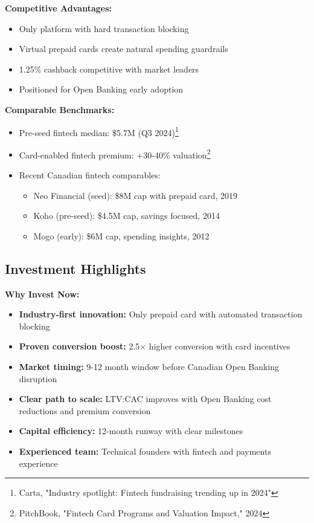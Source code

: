 \documentclass[11pt,letterpaper]{article}
\begin{document}
\textbf{Competitive Advantages:}
\begin{itemize}
\item Only platform with hard transaction blocking
\item Virtual prepaid cards create natural spending guardrails
\item 1.25\% cashback competitive with market leaders
\item Positioned for Open Banking early adoption
\end{itemize}

\textbf{Comparable Benchmarks:}
\begin{itemize}
\item Pre-seed fintech median: \$5.7M (Q3 2024)\footnote{Carta, "Industry spotlight: Fintech fundraising trending up in 2024"}
\item Card-enabled fintech premium: +30-40\% valuation\footnote{PitchBook, "Fintech Card Programs and Valuation Impact," 2024}
\item Recent Canadian fintech comparables:
\begin{itemize}
\item Neo Financial (seed): \$8M cap with prepaid card, 2019
\item Koho (pre-seed): \$4.5M cap, savings focused, 2014
\item Mogo (early): \$6M cap, spending insights, 2012
\end{itemize}
\end{itemize}

\subsection{Investment Highlights}

\textbf{Why Invest Now:}
\begin{itemize}
\item \textbf{Industry-first innovation:} Only prepaid card with automated transaction blocking
\item \textbf{Proven conversion boost:} 2.5× higher conversion with card incentives
\item \textbf{Market timing:} 9-12 month window before Canadian Open Banking disruption
\item \textbf{Clear path to scale:} LTV:CAC improves with Open Banking cost reductions and premium conversion
\item \textbf{Capital efficiency:} 12-month runway with clear milestones
\item \textbf{Experienced team:} Technical founders with fintech and payments experience
\end{itemize}
\end{document}
